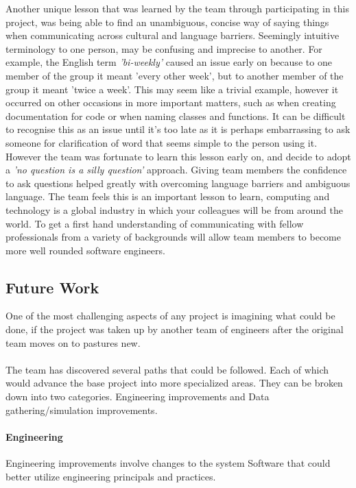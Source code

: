 \documentclass[11pt]{article}
\begin{document}
{\begin{enumerate}
	Another unique lesson that was learned by the team through participating in this project, was being able to find an unambiguous, concise way of saying things when communicating across cultural and language barriers. Seemingly intuitive terminology to one person, may be confusing and imprecise to another. For example, the English term \textit{'bi-weekly'} caused an issue early on because to one member of the group it meant 'every other week', but to another member of the group it meant 'twice a week'. This may seem like a trivial example, however it occurred on other occasions in more important matters, such as when creating documentation for code or when naming classes and functions. It can be difficult to recognise this as an issue until it's too late as it is perhaps embarrassing to ask someone for clarification of word that seems simple to the person using it. However the team was fortunate to learn this lesson early on, and decide to adopt a \textit{'no question is a silly question'} approach. Giving team members the confidence to ask questions helped greatly with overcoming language barriers and ambiguous language. The team feels this is an important lesson to learn, computing and technology is a global industry in which your colleagues will be from around the world. To get a first hand understanding of communicating with fellow professionals from a variety of backgrounds will allow team members to become more well rounded software engineers.

\pagebreak



\pagebreak
\subsection{Future Work} 
One of the most challenging aspects of any project is imagining what could be done, if the project was taken up by another team of engineers after the original team moves on to pastures new.
\\~\\
The team has discovered several paths that could be followed. Each of which would advance the base project into more specialized areas.
They can be broken down into two categories. Engineering improvements and Data gathering/simulation improvements.

\paragraph{Engineering}
Engineering improvements involve changes to the system Software that could better utilize engineering principals and practices.


\end{enumerate}}
\end{document}
